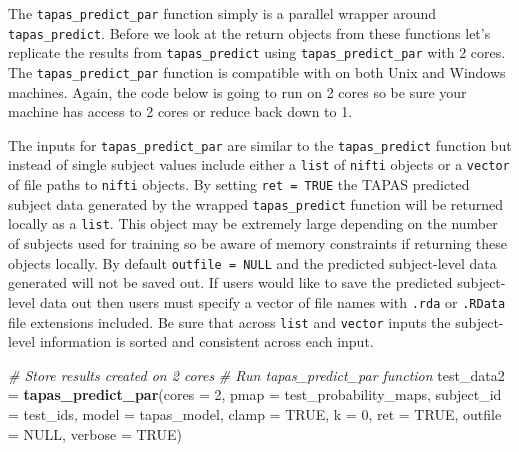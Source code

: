 \documentclass[]{article}
\newenvironment{Shaded}{\begin{snugshade}}{\end{snugshade}}
\newcommand{\CommentTok}[1]{\textcolor[rgb]{0.56,0.35,0.01}{\textit{#1}}}
\newcommand{\DataTypeTok}[1]{\textcolor[rgb]{0.13,0.29,0.53}{#1}}
\newcommand{\DecValTok}[1]{\textcolor[rgb]{0.00,0.00,0.81}{#1}}
\newcommand{\KeywordTok}[1]{\textcolor[rgb]{0.13,0.29,0.53}{\textbf{#1}}}
\newcommand{\NormalTok}[1]{#1}
\newcommand{\OtherTok}[1]{\textcolor[rgb]{0.56,0.35,0.01}{#1}}
\newcommand{\StringTok}[1]{\textcolor[rgb]{0.31,0.60,0.02}{#1}}
\begin{document}
The \texttt{tapas\_predict\_par} function simply is a parallel wrapper
around \texttt{tapas\_predict}. Before we look at the return objects
from these functions let's replicate the results from
\texttt{tapas\_predict} using \texttt{tapas\_predict\_par} with 2 cores.
The \texttt{tapas\_predict\_par} function is compatible with on both
Unix and Windows machines. Again, the code below is going to run on 2
cores so be sure your machine has access to 2 cores or reduce back down
to 1.

The inputs for \texttt{tapas\_predict\_par} are similar to the
\texttt{tapas\_predict} function but instead of single subject values
include either a \texttt{list} of \texttt{nifti} objects or a
\texttt{vector} of file paths to \texttt{nifti} objects. By setting
\texttt{ret\ =\ TRUE} the TAPAS predicted subject data generated by the
wrapped \texttt{tapas\_predict} function will be returned locally as a
\texttt{list}. This object may be extremely large depending on the
number of subjects used for training so be aware of memory constraints
if returning these objects locally. By default \texttt{outfile\ =\ NULL}
and the predicted subject-level data generated will not be saved out. If
users would like to save the predicted subject-level data out then users
must specify a vector of file names with \texttt{.rda} or
\texttt{.RData} file extensions included. Be sure that across
\texttt{list} and \texttt{vector} inputs the subject-level information
is sorted and consistent across each input.

\begin{Shaded}
\begin{Highlighting}[]
\CommentTok{# Store results created on 2 cores}
\CommentTok{# Run tapas_predict_par function}
\NormalTok{test_data2 =}\StringTok{ }\KeywordTok{tapas_predict_par}\NormalTok{(}\DataTypeTok{cores =} \DecValTok{2}\NormalTok{, }
                               \DataTypeTok{pmap =}\NormalTok{ test_probability_maps, }
                               \DataTypeTok{subject_id =}\NormalTok{ test_ids, }
                               \DataTypeTok{model =}\NormalTok{ tapas_model, }
                               \DataTypeTok{clamp =} \OtherTok{TRUE}\NormalTok{,}
                               \DataTypeTok{k =} \DecValTok{0}\NormalTok{, }
                               \DataTypeTok{ret =} \OtherTok{TRUE}\NormalTok{, }
                               \DataTypeTok{outfile =} \OtherTok{NULL}\NormalTok{, }
                               \DataTypeTok{verbose =} \OtherTok{TRUE}\NormalTok{)}
\end{Highlighting}
\end{Shaded}
\end{document}
